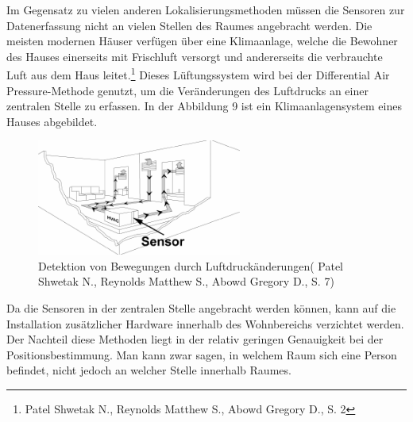 Im Gegensatz zu vielen anderen Lokalisierungsmethoden müssen die Sensoren zur Datenerfassung nicht an vielen Stellen des Raumes angebracht werden. Die meisten modernen Häuser verfügen über eine Klimaanlage, welche die Bewohner des Hauses einerseits mit Frischluft versorgt und andererseits die verbrauchte Luft aus dem Haus leitet.\footnote{Patel Shwetak N., Reynolds Matthew S., Abowd Gregory D., S. 2} Dieses Lüftungssystem wird bei der Differential Air Pressure-Methode genutzt, um die Veränderungen des Luftdrucks an einer zentralen Stelle zu erfassen. In der Abbildung 9 ist ein Klimaanlagensystem eines Hauses abgebildet. 

\begin{figure}[H]
	\centering
	\includegraphics[width=0.6\textwidth]{pictures/dap_klima}
	\caption{Detektion von Bewegungen durch Luftdruckänderungen( Patel Shwetak N., Reynolds Matthew S., Abowd Gregory D., S. 7)}
\end{figure} 

Da die Sensoren in der zentralen Stelle angebracht werden können, kann auf die Installation zusätzlicher Hardware innerhalb des Wohnbereichs verzichtet werden. Der Nachteil diese Methoden liegt in der relativ geringen Genauigkeit bei der Positionsbestimmung. Man kann zwar sagen, in welchem Raum sich eine Person befindet, nicht jedoch an welcher Stelle innerhalb Raumes.

